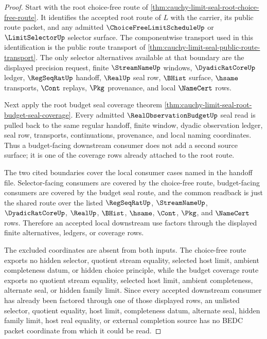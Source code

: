 \begin{proof}
Start with the root choice-free route of \autoref{thm:cauchy-limit-seal-root-choice-free-route}. It identifies the accepted root route of $L$ with the carrier, its public route packet, and any admitted $\ChoiceFreeLimitScheduleUp$ or $\LimitSelectorUp$ selector surface. The componentwise transport used in this identification is the public route transport of \autoref{thm:cauchy-limit-seal-public-route-transport}. The only selector alternatives available at that boundary are the displayed precision request, finite $\StreamNameUp$ windows, $\DyadicRatCoreUp$ ledger, $\RegSeqRatUp$ handoff, $\RealUp$ seal row, $\BHist$ surface, $\hsame$ transports, $\Cont$ replays, $\Pkg$ provenance, and local $\NameCert$ rows.

Next apply the root budget seal coverage theorem \autoref{thm:cauchy-limit-seal-root-budget-seal-coverage}. Every admitted $\RealObservationBudgetUp$ seal read is pulled back to the same regular handoff, finite window, dyadic observation ledger, seal row, transports, continuations, provenance, and local naming coordinates. Thus a budget-facing downstream consumer does not add a second source surface; it is one of the coverage rows already attached to the root route.

The two cited boundaries cover the local consumer cases named in the handoff file. Selector-facing consumers are covered by the choice-free route, budget-facing consumers are covered by the budget seal route, and the common readback is just the shared route over the listed $\RegSeqRatUp$, $\StreamNameUp$, $\DyadicRatCoreUp$, $\RealUp$, $\BHist$, $\hsame$, $\Cont$, $\Pkg$, and $\NameCert$ rows. Therefore an accepted local downstream use factors through the displayed finite alternatives, ledgers, or coverage rows.

The excluded coordinates are absent from both inputs. The choice-free route exports no hidden selector, quotient stream equality, selected host limit, ambient completeness datum, or hidden choice principle, while the budget coverage route exports no quotient stream equality, selected host limit, ambient completeness, alternate seal, or hidden family limit. Since every accepted downstream consumer has already been factored through one of those displayed rows, an unlisted selector, quotient equality, host limit, completeness datum, alternate seal, hidden family limit, host real equality, or external completion source has no BEDC packet coordinate from which it could be read.
\end{proof}
